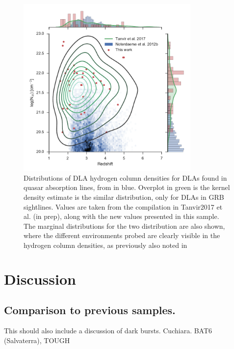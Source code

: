 \documentclass{aa}    %
\begin{document}
\begin{figure}
	\centering
	\includegraphics[width=9cm]{figures/NH_dist.pdf}
	\caption{Distributions of DLA hydrogen column densities for DLAs found in
		quasar absorption lines, from \citep{Noterdaeme2012b} in blue. Overplot in green is the kernel density estimate
		is the similar distribution, only for DLAs in GRB sightlines. Values are taken
		from the compilation in Tanvir2017 et al. (in prep)\citet{Tanvir2017}, along
		with the new values presented in this sample. The marginal distributions for
		the two distribution are also shown, where the different environments probed
		are clearly visible in the hydrogen column densities, as previously also noted
		in \citet{Fynbo2009}}
	\label{fig:NH_dist}
\end{figure}


\section{Discussion}

\subsection{Comparison to previous samples.}	

This should also include a discussion of dark bursts. 
Cuchiara. BAT6 (Salvaterra), TOUGH
\end{document}
